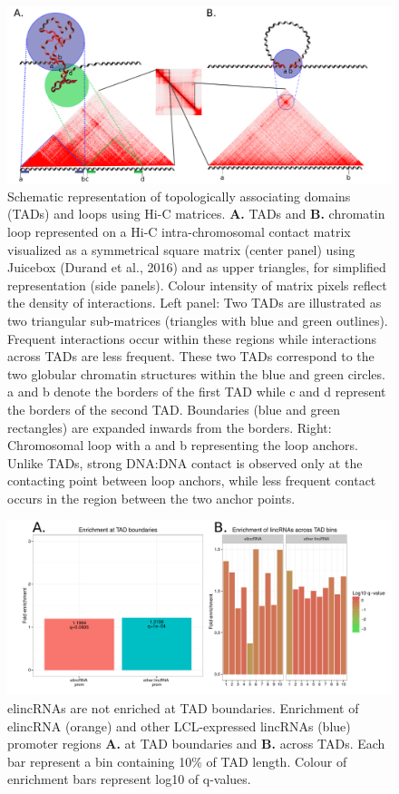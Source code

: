 \documentclass[11pt,a4paper]{report}
\begin{document}
\begin{figure}[ht]
	\includegraphics[width=1\textwidth]{Figures/3_TAD_loop_definition.pdf}
	\caption{Schematic representation of topologically associating domains (TADs) and loops using Hi-C matrices. \textbf{A.} TADs and \textbf{B.} chromatin loop represented on a Hi-C intra-chromosomal contact matrix visualized as a symmetrical square matrix (center panel) using Juicebox (Durand et al., 2016)⁠ and as upper triangles, for simplified representation (side panels). Colour intensity of matrix pixels reflect the density of interactions. Left panel: Two TADs are illustrated as two triangular sub-matrices (triangles with blue and green outlines). Frequent interactions occur within these regions while interactions across TADs are less frequent. These two TADs correspond to the two globular chromatin structures within the blue and green circles. a and b denote the borders of the first TAD while c and d represent the borders of the second TAD. Boundaries (blue and green rectangles) are expanded inwards from the borders. Right: Chromosomal loop with a and b representing the loop anchors. Unlike TADs, strong DNA:DNA contact is observed only at the contacting point between loop anchors, while less frequent contact occurs in the region between the two anchor points. }
	\label{TAD_loop_def}
\end{figure}

\begin{figure}[ht]
	\includegraphics[width=1\textwidth]{Figures/4_enrich_boundaries.pdf}
	\caption{elincRNAs are not enriched at TAD boundaries. Enrichment of elincRNA (orange) and other LCL-expressed lincRNAs (blue) promoter regions \textbf{A.} at TAD boundaries and \textbf{B.} across TADs. Each bar represent a bin containing 10\% of TAD length. Colour of enrichment bars represent log10 of q-values. }
	\label{enrich_boundaries}
\end{figure}
\end{document}
